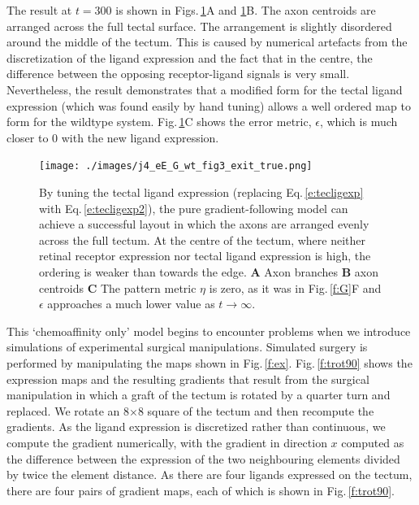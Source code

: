 \documentclass[11pt, a4paper]{article}
\begin{document}
The result at $t=300$ is shown in Figs.\,\ref{f:G0}A
and \ref{f:G0}B. The axon centroids are arranged across the full tectal
surface.  The arrangement is slightly disordered around the middle of the
tectum. This is caused by numerical artefacts from the discretization of the
ligand expression and the fact that in the centre, the difference between the
opposing receptor-ligand signals is very small. Nevertheless, the result
demonstrates that a modified form for the tectal ligand expression (which was
found easily by hand tuning) allows a well ordered map to form for the
wildtype system. Fig.\,\ref{f:G0}C shows the error metric, $\epsilon$,
which is much closer to 0 with the new ligand expression.

\begin{figure}
\texttt{[image: ./images/j4\_eE\_G\_wt\_fig3\_exit\_true.png]}
\caption{By tuning the tectal ligand expression (replacing Eq.\,\ref{e:tecligexp} with
 Eq.\,\ref{e:tecligexp2}), the pure gradient-following model can achieve a
 successful layout in which the axons are arranged evenly across the full
 tectum. At the centre of the tectum, where neither retinal receptor
 expression nor tectal ligand expression is high, the ordering is weaker than
 towards the edge. \textbf{A} Axon branches \textbf{B} axon
 centroids \textbf{C} The pattern metric $\eta$ is zero, as it was in
 Fig.\,\ref{f:G}F and $\epsilon$ approaches a much lower value as $t \to \infty$.}
\label{f:G0}
\end{figure}

This `chemoaffinity only' model begins to encounter problems when we introduce
simulations of experimental surgical manipulations. Simulated surgery is
performed by manipulating the maps shown in
Fig.\,\ref{f:ex}. Fig.\,\ref{f:trot90} shows the expression maps and the
resulting gradients that result from the surgical manipulation in which a
graft of the tectum is rotated by a quarter turn and replaced. We rotate an
8$\times$8 square of the tectum and then recompute the gradients. As the ligand
expression is discretized rather than continuous, we compute the gradient
numerically, with the gradient in direction $x$ computed as the difference
between the expression of the two neighbouring elements divided by twice the
element distance. As there are four ligands expressed on the tectum, there are
four pairs of gradient maps, each of which is shown in Fig.\,\ref{f:trot90}.
\end{document}
